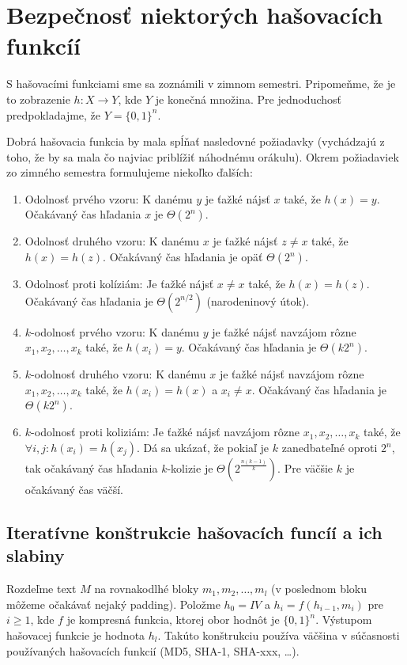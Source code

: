 \section{Bezpečnosť niektorých hašovacích funkcíí}

S hašovacími funkciami sme sa zoznámili v zimnom semestri.
Pripomeňme, že je to zobrazenie $h: X \to Y$, kde $Y$ je konečná množina.
Pre jednoduchosť predpokladajme, že $Y = \{0,1\}^n$. 

Dobrá hašovacia funkcia by mala spĺňať nasledovné požiadavky 
(vychádzajú z toho, že by sa mala čo najviac priblížiť náhodnému orákulu). 
Okrem požiadaviek zo zimného semestra formulujeme niekoľko ďalších:
\begin{enumerate}
\itemsep -1.2mm
\item Odolnosť prvého vzoru: K danému $y$ je ťažké nájsť $x$ také, 
že $h(x) = y$. Očakávaný čas hľadania $x$ je $\Theta(2^n)$.
\item Odolnosť druhého vzoru: K danému $x$ je ťažké nájsť 
$z \neq x$ také, že $h(x) = h(z)$. Očakávaný čas hľadania je opäť
$\Theta(2^n)$.
\item Odolnosť proti kolíziám: Je ťažké nájsť $x \neq x$ také, 
že $h(x) = h(z)$. Očakávaný čas hľadania je $\Theta(2^{n/2})$ (narodeninový útok).
\vskip 0.5cm
\item $k$-odolnosť prvého vzoru: K danému $y$ je ťažké nájsť navzájom rôzne 
$x_1, x_2, \dots, x_k$ také, že $h(x_i) = y$. Očakávaný čas hľadania
je $\Theta(k 2^n)$.
\item $k$-odolnosť druhého vzoru: K danému $x$ je ťažké nájsť navzájom rôzne 
$x_1, x_2, \dots, x_k$ také, že $h(x_i) = h(x)$ a $x_i \neq x$.
Očakávaný čas hľadania je $\Theta(k 2^n)$.
\item $k$-odolnosť proti koliziám: Je ťažké nájsť navzájom rôzne 
$x_1, x_2, \dots, x_k$ také, že $\forall i, j\colon h(x_i) = h(x_j)$. 
Dá sa ukázať, že pokiaľ je $k$ zanedbateľné oproti $2^n$, tak očakávaný 
čas hľadania $k$-kolizie je $\Theta(2^{\frac{n(k-1)}{k}})$.
Pre väčšie $k$ je očakávaný čas väčší.
\end{enumerate}

\subsection {Iteratívne konštrukcie hašovacích funcíí a ich slabiny}

Rozdeľme text $M$ na rovnakodlhé bloky $m_1, m_2, \dots, m_l$
(v poslednom bloku môžeme očakávať nejaký padding).
Položme $h_0 = IV$ a $h_i = f(h_{i-1}, m_i)$ pre $i \geq 1$, kde $f$ 
je kompresná funkcia, ktorej obor hodnôt je $\{0,1\}^n$.
Výstupom hašovacej funkcie je hodnota $h_l$. Takúto konštrukciu 
používa väčšina v súčasnosti používaných hašovacích funkcií
(MD5, SHA-1, SHA-xxx, \dots).


